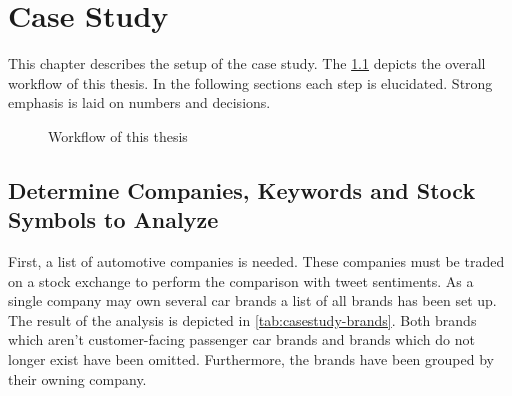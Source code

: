 
\chapter{Case Study}
\label{c:casestudy}

This chapter describes the setup of the case study.
The \cref{fig:casestudy-workflow} depicts the overall workflow of this thesis.
In the following sections each step is elucidated.
Strong emphasis is laid on numbers and decisions.

\begin{figure}[ht]
  \centering


  \caption{Workflow of this thesis}
  \label{fig:casestudy-workflow}
\end{figure}

\section{Determine Companies, Keywords and Stock Symbols to Analyze}
\label{s:casestudy-companieskeywords}

First, a list of automotive companies is needed.
These companies must be traded on a stock exchange to perform the comparison with tweet sentiments.
As a single company may own several car brands a list of all brands has been set up.
The result of the analysis is depicted in \cref{tab:casestudy-brands}.
Both brands which aren't customer-facing passenger car brands and brands which do not longer exist have been omitted.
Furthermore, the brands have been grouped by their owning company.

